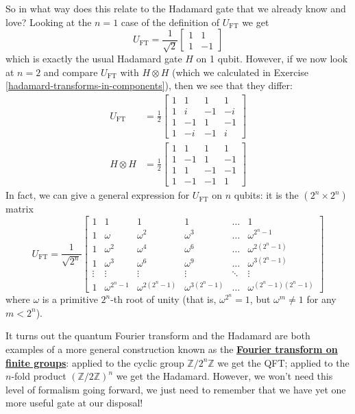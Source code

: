 \documentclass[fleqn,a4paper]{article}
\theoremstyle{definition}
\theoremstyle{definition}
\theoremstyle{definition}
\theoremstyle{definition}
\theoremstyle{remark}
\begin{document}
So in what way does this relate to the Hadamard gate that we already know and love?
Looking at the \(n=1\) case of the definition of \(U_{\mathrm{FT}}\) we get
\[
  U_{\mathrm{FT}}
  = \frac{1}{\sqrt{2}}
  \begin{bmatrix}
    1 & 1
  \\1 & -1
  \end{bmatrix}
\]
which is exactly the usual Hadamard gate \(H\) on 1 qubit.
However, if we now look at \(n=2\) and compare \(U_{\mathrm{FT}}\) with \(H\otimes H\) (which we calculated in Exercise \ref{hadamard-transforms-in-components}), then we see that they differ:
\[
  \begin{aligned}
    U_{\mathrm{FT}}
    &= \frac{1}{2}
    \begin{bmatrix}
      1 & 1 & 1 & 1
    \\1 & i & -1 & -i
    \\1 & -1 & 1 & -1
    \\1 & -i & -1 & i
    \end{bmatrix}
  \\H\otimes H
    &= \frac{1}{2}
    \begin{bmatrix}
      1 & 1 & 1 & 1
    \\1 & -1 & 1 & -1
    \\1 & 1 & -1 & -1
    \\1 & -1 & -1 & 1
    \end{bmatrix}
  \end{aligned}
\]
In fact, we can give a general expression for \(U_{\mathrm{FT}}\) on \(n\) qubits: it is the \((2^n\times 2^n)\) matrix
\[
  U_{\mathrm{FT}}
  = \frac{1}{\sqrt{2^n}}
  \begin{bmatrix}
    1 & 1 & 1 & 1 & \ldots & 1
  \\1 & \omega & \omega^2 & \omega^3 & \ldots & \omega^{2^n-1}
  \\1 & \omega^2 & \omega^4 & \omega^6 & \ldots & \omega^{2(2^n-1)}
  \\1 & \omega^3 & \omega^6 & \omega^9 & \ldots & \omega^{3(2^n-1)}
  \\\vdots & \vdots & \vdots & \vdots & \ddots & \vdots
  \\1 & \omega^{2^n-1} & \omega^{2(2^n-1)} & \omega^{3(2^n-1)} & \ldots & \omega^{(2^n-1)(2^n-1)}
  \end{bmatrix}
\]
where \(\omega\) is a primitive \(2^n\)-th root of unity (that is, \(\omega^{2^n}=1\), but \(\omega^m\neq1\) for any \(m<2^n\)).

It turns out the quantum Fourier transform and the Hadamard are both examples of a more general construction known as the \href{https://en.wikipedia.org/wiki/Fourier_transform_on_finite_groups}{\textbf{Fourier transform on finite groups}}: applied to the cyclic group \(\mathbb{Z}/2^n\mathbb{Z}\) we get the QFT; applied to the \(n\)-fold product \((\mathbb{Z}/2\mathbb{Z})^n\) we get the Hadamard.
However, we won't need this level of formalism going forward, we just need to remember that we have yet one more useful gate at our disposal!
\end{document}
